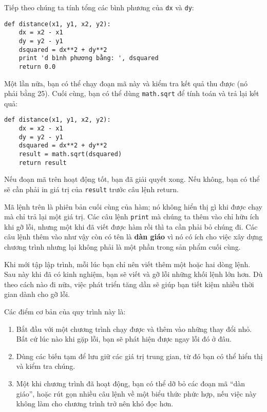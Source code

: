 \documentclass[11pt]{book}
\begin{document}
Tiếp theo chúng ta tính tổng các bình phương của {\tt dx} và {\tt dy}:

\beforeverb
\begin{verbatim}
def distance(x1, y1, x2, y2):
    dx = x2 - x1
    dy = y2 - y1
    dsquared = dx**2 + dy**2
    print 'd bình phương bằng: ', dsquared
    return 0.0
\end{verbatim}
\afterverb
%
Một lần nữa, bạn có thể chạy đoạn mã này và kiểm tra kết quả thu được
(nó phải bằng 25).
Cuối cùng, bạn có thể dùng {\tt math.sqrt} để tính toán và trả lại kết quả:


\beforeverb
\begin{verbatim}
def distance(x1, y1, x2, y2):
    dx = x2 - x1
    dy = y2 - y1
    dsquared = dx**2 + dy**2
    result = math.sqrt(dsquared)
    return result
\end{verbatim}
\afterverb
%
Nếu đoạn mã trên hoạt động tốt, bạn đã giải quyết xong. Nếu không,
bạn có thể sẽ cần phải in  giá trị của {\tt result} trước câu lệnh
return.

Mã lệnh trên là phiên bản cuối cùng của hàm; nó không hiển thị gì khi
được chạy mà chỉ trả lại một giá trị. Các câu lệnh {\tt print} mà chúng
ta thêm vào chỉ hữu ích khi gỡ lỗi, nhưng một khi đã viết được hàm rồi
thì ta cần phải bỏ chúng đi. Các câu lệnh thêm vào như vậy còn có tên 
là {\bf dàn giáo} vì nó có ích cho việc xây dựng chương trình nhưng lại
không phải là một phần trong sản phẩm cuối cùng.


Khi mới tập lập trình, mỗi lúc bạn chỉ nên viết thêm một hoặc hai
dòng lệnh. Sau này khi đã có kinh nghiệm, bạn sẽ viết và gỡ lỗi những
khối lệnh lớn hơn. Dù theo cách nào đi nữa, việc phát triển tăng dần
sẽ giúp bạn tiết kiệm nhiều thời gian dành cho gỡ lỗi.

Các điểm cơ bản của quy trình này là:

\begin{enumerate}

\item Bắt đầu với một chương trình chạy được và thêm vào những
thay đổi nhỏ. Bất cứ lúc nào khi gặp lỗi, bạn sẽ phát hiện được ngay
lỗi đó ở đâu.

\item Dùng các biến tạm để lưu giữ các giá trị trung gian, từ đó bạn
có thể hiển thị và kiểm tra chúng.

\item Một khi chương trình đã hoạt động, bạn có thể dỡ bỏ các đoạn
mã ``dàn giáo'', hoặc rút gọn nhiều câu lệnh về một biểu thức
phức hợp, nếu việc này không làm cho chương trình trở nên khó đọc hơn.

\end{enumerate}
\end{document}
